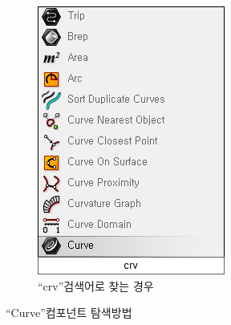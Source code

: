 \documentclass[11pt]{article}
\begin{document}
\begin{figure}[H]
\begin{subfigure}{0.35\textwidth}
        \includegraphics[width=.7\textwidth]{./img/mbs_08_crv.png}
        \caption{``crv''검색어로 찾는 경우}
        \label{fig:mbs_08_crv}
    \end{subfigure}
    \caption{``Curve''컴포넌트 탐색방법}
    \label{fig:mbs_08_curveComp}
\end{figure}
\end{document}
